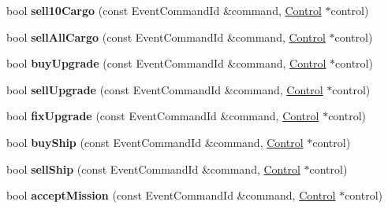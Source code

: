 \begin{DoxyCompactItemize}
\item 
bool {\bfseries sell10\+Cargo} (const Event\+Command\+Id \&command, \hyperlink{classControl}{Control} $\ast$control)\hypertarget{classBaseComputer_a680a84e37aa7e964206ceda6e12e5d93}{}\label{classBaseComputer_a680a84e37aa7e964206ceda6e12e5d93}

\item 
bool {\bfseries sell\+All\+Cargo} (const Event\+Command\+Id \&command, \hyperlink{classControl}{Control} $\ast$control)\hypertarget{classBaseComputer_a695f970095047a0b00c72a135dafa713}{}\label{classBaseComputer_a695f970095047a0b00c72a135dafa713}

\item 
bool {\bfseries buy\+Upgrade} (const Event\+Command\+Id \&command, \hyperlink{classControl}{Control} $\ast$control)\hypertarget{classBaseComputer_aab6f7a84bc37e3cec8286ee9c0480ebf}{}\label{classBaseComputer_aab6f7a84bc37e3cec8286ee9c0480ebf}

\item 
bool {\bfseries sell\+Upgrade} (const Event\+Command\+Id \&command, \hyperlink{classControl}{Control} $\ast$control)\hypertarget{classBaseComputer_ada0cac1d69aac3d83a2c85a0aa3d75ea}{}\label{classBaseComputer_ada0cac1d69aac3d83a2c85a0aa3d75ea}

\item 
bool {\bfseries fix\+Upgrade} (const Event\+Command\+Id \&command, \hyperlink{classControl}{Control} $\ast$control)\hypertarget{classBaseComputer_a97bde2f7e9fa2c513c276724a877572a}{}\label{classBaseComputer_a97bde2f7e9fa2c513c276724a877572a}

\item 
bool {\bfseries buy\+Ship} (const Event\+Command\+Id \&command, \hyperlink{classControl}{Control} $\ast$control)\hypertarget{classBaseComputer_a1ba06d82b330baf81a1951a0c270abbf}{}\label{classBaseComputer_a1ba06d82b330baf81a1951a0c270abbf}

\item 
bool {\bfseries sell\+Ship} (const Event\+Command\+Id \&command, \hyperlink{classControl}{Control} $\ast$control)\hypertarget{classBaseComputer_a8d196667a632331c33fc7cb3e6c68c27}{}\label{classBaseComputer_a8d196667a632331c33fc7cb3e6c68c27}

\item 
bool {\bfseries accept\+Mission} (const Event\+Command\+Id \&command, \hyperlink{classControl}{Control} $\ast$control)\hypertarget{classBaseComputer_add00aa647096102fff62c71829148ae7}{}\label{classBaseComputer_add00aa647096102fff62c71829148ae7}


\end{DoxyCompactItemize}
